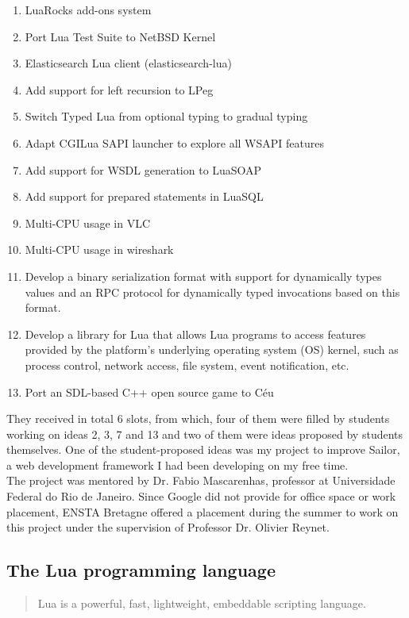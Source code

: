 \documentclass{article}
\begin{document}
\begin{enumerate}\item LuaRocks add-ons system
\item Port Lua Test Suite to NetBSD Kernel
\item Elasticsearch Lua client (elasticsearch-lua)
\item Add support for left recursion to LPeg
\item Switch Typed Lua from optional typing to gradual typing
\item Adapt CGILua SAPI launcher to explore all WSAPI features
\item Add support for WSDL generation to LuaSOAP
\item Add support for prepared statements in LuaSQL
\item Multi-CPU usage in VLC
\item Multi-CPU usage in wireshark
\item Develop a binary serialization format with support for dynamically types values and an RPC protocol for dynamically typed invocations based on this format.
\item Develop a library for Lua that allows Lua programs to access features provided by the platform's underlying operating system (OS) kernel, such as process control, network access, file system, event notification, etc.
\item Port an SDL-based C++ open source game to Céu
\end{enumerate}

They received in total 6 slots, from which, four of them were filled by students working on ideas 2, 3, 7 and 13 and two of them were ideas proposed by students themselves. One of the student-proposed ideas was my project to improve Sailor, a web development framework I had been developing on my free time. \\

The project was mentored by Dr. Fabio Mascarenhas, professor at Universidade Federal do Rio de Janeiro. Since Google did not provide for office space or work placement, ENSTA Bretagne offered a placement during the summer to work on this project under the supervision of Professor Dr. Olivier Reynet. \\

\subsection{The Lua programming language}

\begin{quotation}Lua is a powerful, fast, lightweight, embeddable scripting language.\autocite{luaorg}\end{quotation}
\end{document}
